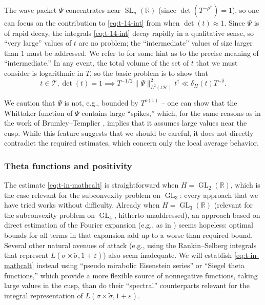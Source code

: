 \documentclass[reqno]{amsart}
\DeclareMathOperator{\SL}{SL}
\DeclareMathOperator{\GL}{GL}
\def\eps{\varepsilon}
\theoremstyle{plain} \newtheorem{theorem} {Theorem}
\theoremstyle{definition} \newtheorem{definition} [theorem] {Definition}
\theoremstyle{itplain} %
\numberwithin{equation}{section}
\numberwithin{theorem}{section}
\begin{document}
The wave packet $\Psi$ concentrates near $\SL_n(\mathbb{R})$ (since $\det(T^{-\rho^\vee}) = 1$), so one can focus on the contribution to \eqref{eq:t-14-int} from when $\det(t) \approx 1$.  Since $\Psi$ is of rapid decay, the integrals \eqref{eq:t-14-int} decay rapidly in a qualitative sense, so ``very large'' values of $t$ are no problem; the ``intermediate'' values of size larger than $1$ must be addressed.  We refer to \cite[\S1.2]{MR4093914} for some hint as to the precise meaning of ``intermediate.''  In any event, the total volume of the set of $t$ that we must consider is logarithmic in $T$, so the basic problem is to show that
\begin{equation}\label{eq:t-in-mathcalt}
  t \in \mathcal{T},
  \det(t) = 1
  \implies
  T^{-1/2}
  \|\Psi \|_{L^2(t \mathcal{H})}^2
  t ^\dagger  \ll
  \delta_H(t)
  T^{-\delta}.
\end{equation}

\begin{remark}
  We caution that $\Psi$ is not, e.g., bounded by $T^{o(1)}$ -- one can show that the Whittaker function of $\Psi$ contains large ``spikes,'' which, for the same reasons as in the work of Brumley--Templier \cite{MR4150475}, implies that it assumes large values near the cusp.  While this feature suggests that we should be careful, it does not directly contradict the required estimates, which concern only the local average behavior.
\end{remark}


\subsubsection{Theta functions and positivity}\label{sec:theta-funct-posit}
The estimate \eqref{eq:t-in-mathcalt} is straightforward when $H = \GL_2(\mathbb{R})$, which is the case relevant for the subconvexity problem on $\GL_3$: every approach that we have tried works without difficulty.  Already when $H = \GL_3(\mathbb{R})$ (relevant for the subconvexity problem on $\GL_4$, hitherto unaddressed), an approach based on direct estimation of the Fourier expansion (e.g., as in \cite{MR3905609}) seems hopeless: optimal bounds for all terms in that expansion add up to a worse than required bound.  Several other natural avenues of attack (e.g., using the Rankin--Selberg integrals that represent $L(\sigma \times \tilde{\sigma}, 1+ \eps)$) also seem inadequate.  We will establish \eqref{eq:t-in-mathcalt} instead using ``pseudo mirabolic Eisenstein series'' or ``Siegel theta functions,'' which provide a more flexible source of nonnegative functions, taking large values in the cusp, than do their ``spectral'' counterparts relevant for the integral representation of $L(\sigma \times \tilde{\sigma}, 1 + \eps)$.
\end{document}
